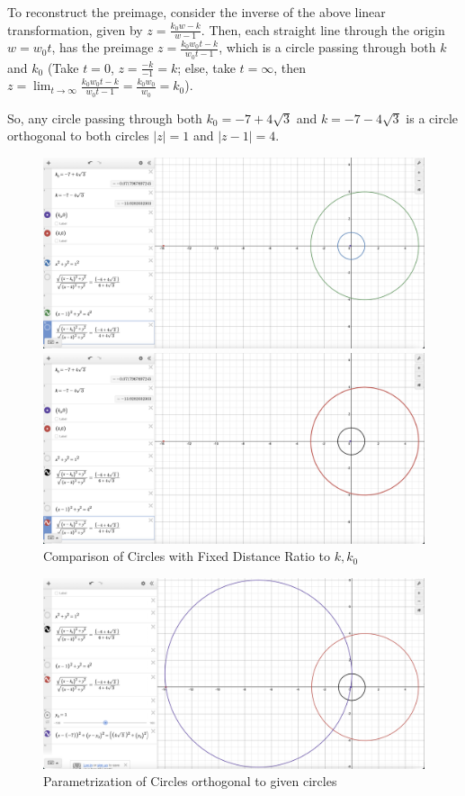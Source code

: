 \documentclass{article}
\begin{document}
To reconstruct the preimage, consider the inverse of the above linear transformation, given by $z=\frac{k_0w-k}{w-1}$.
Then, each straight line through the origin $w=w_0t$, has the preimage $z=\frac{k_0w_0t-k}{w_0t-1}$, which is a circle passing through both $k$ and $k_0$
(Take $t=0$, $z=\frac{-k}{-1}=k$; else, take $t=\infty$, then $z=\lim_{t\rightarrow\infty}\frac{k_0w_0t-k}{w_0t-1}=\frac{k_0w_0}{w_0}=k_0$).

So, any circle passing through both $k_0=-7+4\sqrt{3}$ and $k=-7-4\sqrt{3}$ is a circle orthogonal to both circles $|z|=1$ and $|z-1|=4$.

\hfill

\begin{figure}[h!]
    \begin{center}
        \includegraphics*[width=120mm]{circles 1.png}
        
        \hfill

        \includegraphics*[width=120mm]{circles 2.png}
        \caption{Comparison of Circles with Fixed Distance Ratio to $k,k_0$}
    \end{center}
\end{figure}

\begin{figure}[h!]
    \begin{center}
        \includegraphics*[width=120mm]{orthogonal circle.png}
        \caption{Parametrization of Circles orthogonal to given circles}
    \end{center}
\end{figure}
\end{document}
